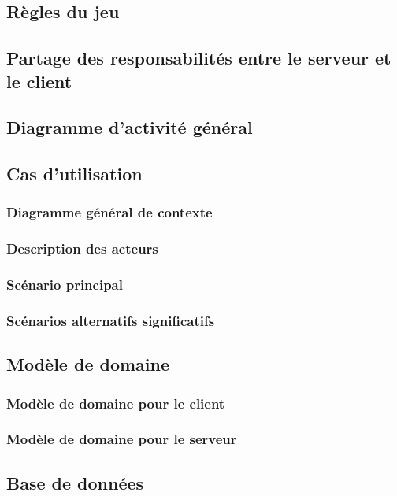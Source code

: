 \documentclass[a4paper,11pt]{article}
\begin{document}
	\subsection{Règles du jeu}
	
	\subsection{Partage des responsabilités entre le serveur et le client}
	
	\subsection{Diagramme d'activité général}
	
	\subsection{Cas d'utilisation}
	\subsubsection{Diagramme général de contexte}
	\subsubsection{Description des acteurs}
	\subsubsection{Scénario principal}
	\subsubsection{Scénarios alternatifs significatifs}
	
	\subsection{Modèle de domaine}
	\subsubsection{Modèle de domaine pour le client}
	\subsubsection{Modèle de domaine pour le serveur}
	
	\subsection{Base de données}
\end{document}
